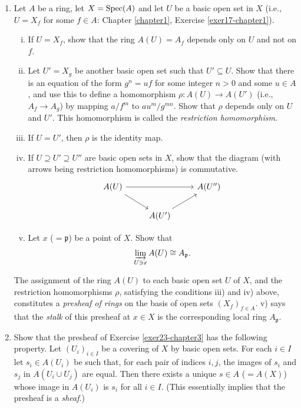 \begin{enumerate}
    \item \label{exer23-chapter3}Let $A$ be a ring, let $X = \operatorname{Spec}(A)$ and let $U$ be a basic open set in $X$ (i.e., $U = X_f$ for some $f \in A$: Chapter \ref{chapter1}, Exercise \ref{exer17-chapter1}).
    \begin{enumerate}[i)]
        \item If $U = X_f$, show that the ring $A(U) = A_f$ depends only on $U$ and not on $f$.
        \item Let $U' = X_g$ be another basic open set such that $U' \subseteq U$. Show that there is an equation of the form $g^n = uf$ for some integer $n > 0$ and some $u \in A$, and use this to define a homomorphism $\rho \colon A(U) \to A(U')$ (i.e., $A_f \to A_g$) by mapping $a/f^m$ to $au^m/g^{mn}$. Show that $\rho$ depends only on $U$ and $U'$. This homomorphism is called the \emph{restriction homomorphism}.
        \item If $U = U'$, then $\rho$ is the identity map.
        \item If $U \supseteq U' \supseteq U''$ are basic open sets in $X$, show that the diagram (with arrows being restriction homomorphisms) is commutative.
        \[\begin{tikzcd}
            {A(U)} && {A(U'')} \\
            & {A(U')}
            \arrow[from=1-1, to=1-3]
            \arrow[from=1-1, to=2-2]
            \arrow[from=2-2, to=1-3]
        \end{tikzcd}\]
        \item Let $x$ ($= \mathfrak{p}$) be a point of $X$. Show that \[\varinjlim_{U\ni x} A(U) \cong A_{\mathfrak{p}}.\]
    \end{enumerate}
    The assignment of the ring $A(U)$ to each basic open set $U$ of $X$, and the restriction homomorphisms $\rho$, satisfying the conditions iii) and iv) above, constitutes a \emph{presheaf of rings} on the basis of open sets $(X_f)_{f \in A}$. v) says that the \emph{stalk} of this presheaf at $x \in X$ is the corresponding local ring $A_{\mathfrak{p}}$.

    \item \label{exer24-chapter3}Show that the presheaf of Exercise \ref{exer23-chapter3} has the following property. Let $(U_i)_{i \in I}$ be a covering of $X$ by basic open sets. For each $i \in I$ let $s_i \in A(U_i)$ be such that, for each pair of indices $i,j$, the images of $s_i$ and $s_j$ in $A(U_i \cup U_j)$ are equal. Then there exists a unique $s \in A$ ($= A(X)$) whose image in $A(U_i)$ is $s_i$ for all $i \in I$. (This essentially implies that the presheaf is a \emph{sheaf}.)


\end{enumerate}
